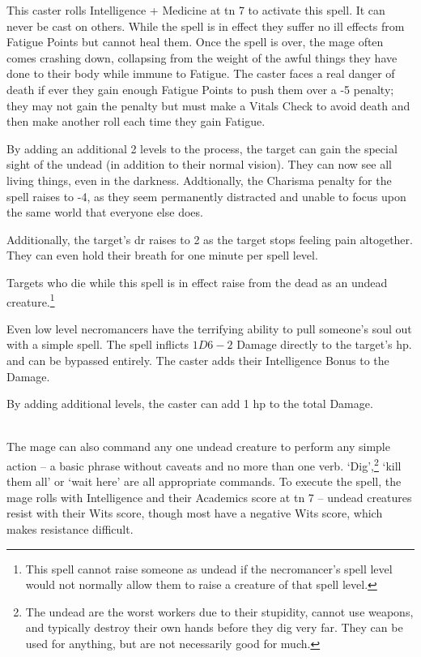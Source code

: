 \documentclass[titlepage,a4paper,openany]{book}
\begin{document}
\begin{multicols}{2}
This caster rolls Intelligence + Medicine at \gls{tn} 7 to activate this spell. It can never be cast on others. While the spell is in effect they suffer no ill effects from Fatigue Points but cannot heal them. Once the spell is over, the mage often comes crashing down, collapsing from the weight of the awful things they have done to their body while immune to Fatigue. The caster faces a real danger of death if ever they gain enough Fatigue Points to push them over a -5 penalty; they may not gain the penalty but must make a Vitals Check to avoid death and then make another roll each time they gain Fatigue.


By adding an additional 2 levels to the process, the target can gain the special sight of the undead (in addition to their normal vision).  They can now see all living things, even in the darkness.  Addtionally, the Charisma penalty for the spell raises to -4, as they seem permanently distracted and unable to focus upon the same world that everyone else does.

Additionally, the target's \gls{dr} raises to 2 as the target stops feeling pain altogether.  They can even hold their breath for one minute per spell level.

Targets who die while this spell is in effect raise from the dead as an undead creature.\footnote{This spell cannot raise someone as undead if the necromancer's spell level would not normally allow them to raise a creature of that spell level.}


Even low level necromancers have the terrifying ability to pull someone's soul out with a simple spell.  The spell inflicts $1D6-2$ Damage directly to the target's \gls{hp}.   and  can be bypassed entirely.  The caster adds their Intelligence Bonus to the Damage.


By adding additional levels, the caster can add 1 \gls{hp} to the total Damage.


\\
The mage can also command any one undead creature to perform any simple action -- a basic phrase without caveats and no more than one verb. `Dig',\footnote{The undead are the worst workers due to their stupidity, cannot use weapons, and typically destroy their own hands before they dig very far.  They can be used for anything, but are not necessarily good for much.} `kill them all' or `wait here' are all appropriate commands. To execute the spell, the mage rolls with Intelligence and their Academics score at \gls{tn} 7 -- undead creatures resist with their Wits score, though most have a negative Wits score, which makes resistance difficult.


\end{multicols}
\end{document}
